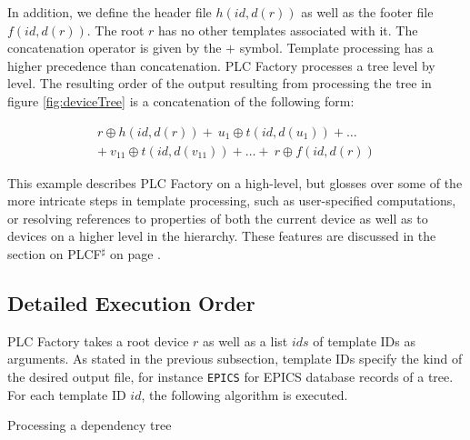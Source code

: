 \documentclass[a4paper,
              ]{jacow}
\begin{document}
In addition, we define the header file $h(\mathit{id}, d(r))$ as well as the footer file $f(\mathit{id}, d(r))$. The root $r$ has no other templates associated with it. The concatenation operator is given by the $+$ symbol. Template processing has a higher precedence than concatenation. PLC Factory processes a tree level by level. The resulting order of the output resulting from processing the tree in figure \ref{fig:deviceTree} is a concatenation of the following form:

\begin{multline}
      r          \oplus h(\mathit{id}, d(r))
+ \  u_1     \oplus t(\mathit{id}, d(u_1))       +  \dots  \\
+ \  v_{11} \oplus t(\mathit{id}, d(v_{11}))   +  \dots + \ r  \oplus f(\mathit{id}, d(r))      
\end{multline}

This example describes PLC Factory on a high-level, but glosses over some of the more intricate steps in template processing, such as user-specified computations, or resolving references to properties of both the current device as well as to devices on a higher level in the hierarchy. These features are discussed in the section on PLCF$^\sharp$ on page \pageref{subsec:plcf}.

\subsection{Detailed Execution Order}
PLC Factory takes a root device $r$ as well as a list $\mathit{ids}$ of template IDs as arguments. As stated in the previous subsection, template IDs specify the kind of the desired output file, for instance \texttt{EPICS} for EPICS database records of a tree. For each template ID $id$, the following algorithm is executed. 

\begin{algorithm}
 \label{alg:algo}
 \caption{Processing a dependency tree}
\end{algorithm}
\end{document}
